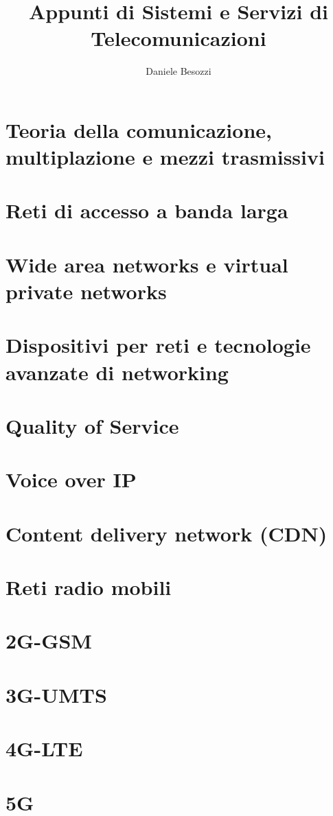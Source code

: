 \documentclass[a4paper,11pt,openany]{book}
\title{Appunti di Sistemi e Servizi di Telecomunicazioni}
\author{Daniele Besozzi}
\date{}
\begin{document}
\frontmatter
\maketitle
\tableofcontents
\mainmatter
\chapter{Teoria della comunicazione, multiplazione e mezzi trasmissivi}

\chapter{Reti di accesso a banda larga}

\chapter{Wide area networks e virtual private networks}

\chapter{Dispositivi per reti e tecnologie avanzate di networking}

\chapter{Quality of Service}

\chapter{Voice over IP}

\chapter{Content delivery network (CDN)}

\chapter{Reti radio mobili}

\chapter{2G-GSM}

\chapter{3G-UMTS}

\chapter{4G-LTE}

\chapter{5G}

\end{document}
